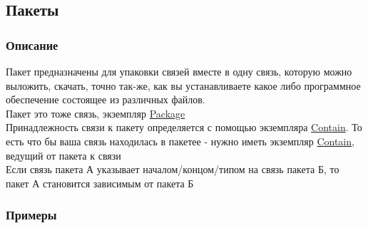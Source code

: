 \subsection{Пакеты}
\subsubsection{Описание}
Пакет предназначены для упаковки связей вместе в одну связь, которую можно
выложить, скачать, точно так-же, как вы устанавливаете какое либо программное
обеспечение состоящее из различных файлов. \\
Пакет это тоже связь, экземпляр \hyperlink{Core.Package.Description}{Package} \\
Принадлежность связи к пакету определяется с помощью экземпляра
\hyperlink{Core.Contain.Description}{Contain}. То есть что бы ваша связь
находилась в  
пакетее - нужно иметь экземпляр \hyperlink{Core.Contain.Description}{Contain},
ведущий
от пакета к связи \\
Если связь пакета А указывает началом/концом/типом на связь пакета Б, то пакет
А становится зависимым от пакета Б \\
\subsubsection{Примеры}
